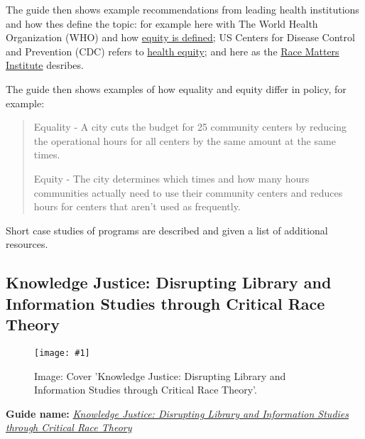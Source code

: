 \documentclass{article}
\newlength{\imgwidth}
\newcommand\scaledgraphics[2]{%
                
\settowidth{\imgwidth}{\texttt{[image: \#1]}}%
                
\setlength{\imgwidth}{\minof{\imgwidth}{#2\textwidth}}%
                
\texttt{[image: \#1]}%
                
}
\begin{document}
The guide then shows example recommendations from leading health institutions and how thes define the topic: for example here with The World Health Organization (WHO) and how \href{https://www.who.int/healthsystems/topics/equity/en/}{equity is defined}; US Centers for Disease Control and Prevention (CDC) refers to \href{https://www.cdc.gov/minorityhealth/strategies2016/index.html}{health equity}; and here as the \href{http://viablefuturescenter.org/racemattersinstitute/}{Race Matters Institute} desribes.


The guide then shows examples of how equality and equity differ in policy, for example: 

\begin{quote}



Equality - A city cuts the budget for 25 community centers by reducing the operational hours for all centers by the same amount at the same times. 

Equity - The city determines which times and how many hours communities actually need to use their community centers and reduces hours for centers that aren't used as frequently.


\end{quote}


Short case studies of programs are described and given a list of additional resources.


\subsection{Knowledge Justice: Disrupting Library and Information Studies through Critical Race Theory}\label{H8244312}



\begin{center}
\begin{figure}
\scaledgraphics{dcc1d35b-4186-4b50-a5a6-cf54422a8064.jpeg}{0.75}
\caption*{Image: Cover 'Knowledge Justice: Disrupting Library and Information Studies through Critical Race Theory'.}\label{F29320001}
\end{figure}


\end{center}


\textbf{Guide name: }\emph{\href{https://direct.mit.edu/books/edited-volume/5114/Knowledge-JusticeDisrupting-Library-and}{Knowledge Justice: Disrupting Library and Information Studies through Critical Race Theory}}\emph{ }\autocite{leung_knowledge_2021} 
\end{document}
